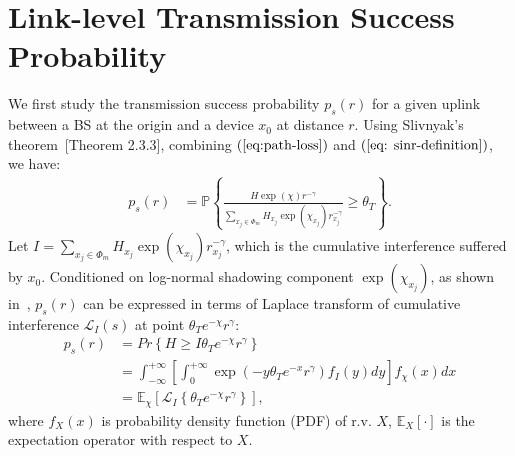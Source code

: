 \section{Link-level Transmission Success Probability}
\label{sec:trans_succ_p_pair}
We first study the transmission success probability $p_s(r)$ for a given uplink between a BS at the origin and a device $x_0$ at distance $r$. Using Slivnyak's theorem~\cite{vaze2015random}[Theorem 2.3.3], combining $(\ref{eq:path-loss})$ and $(\ref{eq: sinr-definition})$, we have:
\begin{align}
p_{s} \left( r\right)
& =\mathbb{P}\left\lbrace \frac{H \exp(\chi) r^{-\gamma}}{\sum_{x_j \in \Phi_{m}} H_{x_j} \exp(\chi_{x_j}) r_{x_j}^{-\gamma}}  \geq \theta_T \right\rbrace. \nonumber
\end{align}
Let $I=\sum_{x_j \in \Phi_{m}} H_{x_j} \exp(\chi_{x_j}) r_{x_j}^{-\gamma}$, which is the cumulative interference suffered by $x_0$. Conditioned on log-normal shadowing component $\exp(\chi_{x_j}) $, as shown in~\cite{haenggi2009interference}, $p_{s}\left( r \right)$ can be expressed in terms of Laplace transform of cumulative interference $\mathcal{L}_{I}(s)$ at point $\theta_{T} e^{-\chi} r^{\gamma}$:
\begin{align}
\label{eq:def_ps}
p_{s}\left( r \right)  &= Pr \left\lbrace H  \geq I \theta_{T} e^{-\chi}r ^{\gamma}  \right\rbrace \nonumber\\ 
&= \int_{-\infty}^{+\infty} \left[ \int_{0}^{+\infty} \exp(-y \theta_{T} e^{-x} r^{\gamma} ) f_{I}(y)dy\right] f_{\chi}(x) dx  \nonumber\\
&= \mathbb{E}_{\chi} \left[ \mathcal{L}_{I}\left\lbrace \theta_{T} e^{-\chi} r^{\gamma}\right\rbrace \right],
\end{align}
where $f_{X} (x)$ is probability density function (PDF) of r.v. $X$, $\mathbb{E}_{X} \left[ \cdot \right] $ is the expectation operator with respect to $X$.
